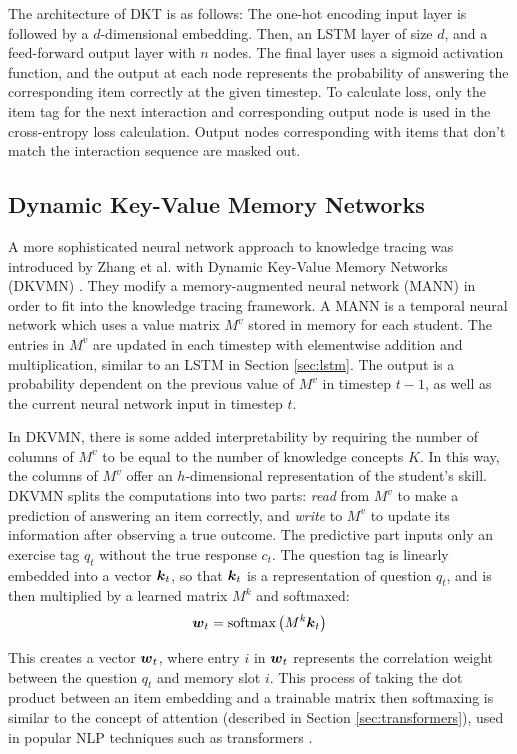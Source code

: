 The architecture of DKT is as follows: The one-hot encoding input layer is followed by a $d$-dimensional embedding. Then, an LSTM layer of size $d$, and a feed-forward output layer with $n$ nodes. The final layer uses a sigmoid activation function, and the output at each node represents the probability of answering the corresponding item correctly at the given timestep. To calculate loss, only the item tag for the next interaction and corresponding output node is used in the cross-entropy loss calculation. Output nodes corresponding with items that don't match the interaction sequence are masked out.

  \subsection{Dynamic Key-Value Memory Networks}\label{sec:dkvmn}
A more sophisticated neural network approach to knowledge tracing was introduced by Zhang et al. with Dynamic Key-Value Memory Networks (DKVMN) \cite{zhang2017}. They modify a memory-augmented neural network (MANN) in order to fit into the knowledge tracing framework. A MANN is a temporal neural network which uses a value matrix $M^v$ stored in memory for each student. The entries in $M^v$ are updated in each timestep with elementwise addition and multiplication, similar to an LSTM in Section \ref{sec:lstm}. The output is a probability dependent on the previous value of $M^v$ in timestep $t-1$, as well as the current neural network input in timestep $t$.

In DKVMN, there is some added interpretability by requiring the number of columns of $M^v$ to be equal to the number of knowledge concepts $K$. In this way, the columns of $M^v$ offer an $h$-dimensional representation of the student's skill. DKVMN splits the computations into two parts: \textit{read} from $M^v$ to make a prediction of answering an item correctly, and \textit{write} to $M^v$ to update its information after observing a true outcome. The predictive part inputs only an exercise tag $q_t$ without the true response $c_t$. The question tag is linearly embedded into a vector $\boldsymbol{k}_t$, so that $\boldsymbol{k}_t$ is a representation of question $q_t$, and is then multiplied by a learned matrix $M^k$ and softmaxed: 
\begin{equation}
  \boldsymbol{w}_t = \text{softmax}\left( M^k \boldsymbol{k}_t \right)
  \label{eq:dkvmn_weight}
\end{equation}

This creates a vector $\boldsymbol{w}_t$, where entry $i$ in $\boldsymbol{w}_t$ represents the correlation weight between the question $q_t$ and memory slot $i$. This process of taking the dot product between an item embedding and a trainable matrix then softmaxing is similar to the concept of attention (described in Section \ref{sec:transformers}), used in popular NLP techniques such as transformers \cite{vaswani2017}.

